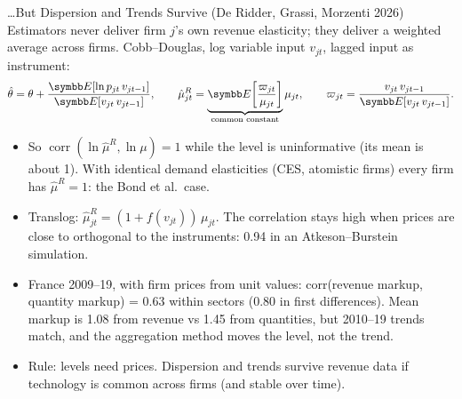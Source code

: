 \documentclass[aspectratio=169,10pt]{beamer}
\begin{document}
\begin{frame}{\ldots But Dispersion and Trends Survive (De Ridder, Grassi, Morzenti 2026)}
\footnotesize
Estimators never deliver firm $j$'s own revenue elasticity; they deliver a weighted average across firms. Cobb--Douglas, log variable input $v_{jt}$, lagged input as instrument:
\begin{align*}
\hat\theta = \theta + \frac{\E[\ln p_{jt}\, v_{jt-1}]}{\E[v_{jt}\, v_{jt-1}]},
\qquad
\hat\mu^R_{jt} = \underbrace{\E\!\left[\frac{\varpi_{jt}}{\mu_{jt}}\right]}_{\text{common constant}} \mu_{jt},
\qquad \varpi_{jt} = \frac{v_{jt}\, v_{jt-1}}{\E[v_{jt}\, v_{jt-1}]}.
\end{align*}
\begin{itemize}
\item So $\operatorname{corr}(\ln\hat\mu^R, \ln\mu) = 1$ while the \alert{level} is uninformative (its mean is about 1). With identical demand elasticities (CES, atomistic firms) every firm has $\hat\mu^R = 1$: the Bond et al.\ case.
\item Translog: $\hat\mu^R_{jt} = (1 + f(v_{jt}))\,\mu_{jt}$. The correlation stays high when prices are close to orthogonal to the instruments: 0.94 in an Atkeson--Burstein simulation.
\item France 2009--19, with firm prices from unit values: corr(revenue markup, quantity markup) = 0.63 within sectors (0.80 in first differences). Mean markup is 1.08 from revenue vs 1.45 from quantities, but 2010--19 trends match, and the aggregation method moves the level, not the trend.
\item \alert{Rule}: levels need prices. Dispersion and trends survive revenue data if technology is common across firms (and stable over time).
\end{itemize}
\end{frame}
\end{document}
